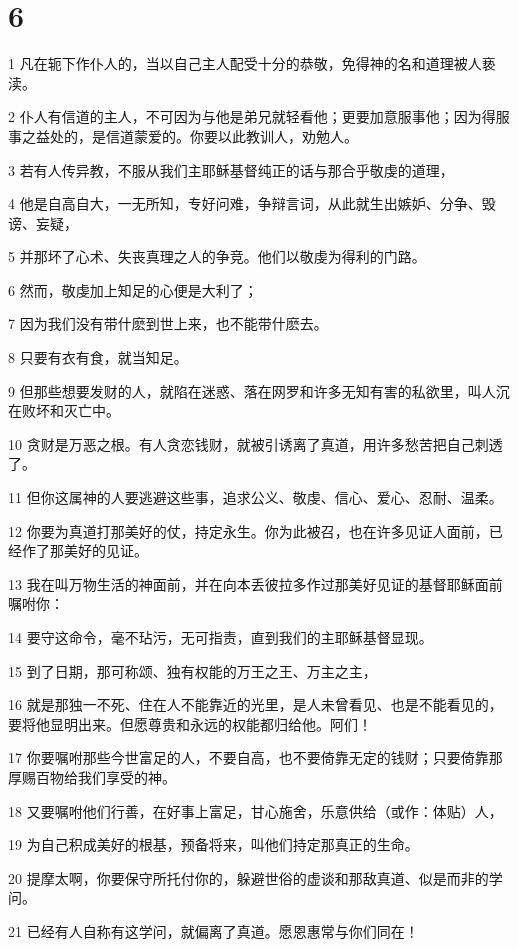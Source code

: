 \chapter{6}

\par 1 凡在轭下作仆人的，当以自己主人配受十分的恭敬，免得神的名和道理被人亵渎。
\par 2 仆人有信道的主人，不可因为与他是弟兄就轻看他；更要加意服事他；因为得服事之益处的，是信道蒙爱的。你要以此教训人，劝勉人。
\par 3 若有人传异教，不服从我们主耶稣基督纯正的话与那合乎敬虔的道理，
\par 4 他是自高自大，一无所知，专好问难，争辩言词，从此就生出嫉妒、分争、毁谤、妄疑，
\par 5 并那坏了心术、失丧真理之人的争竞。他们以敬虔为得利的门路。
\par 6 然而，敬虔加上知足的心便是大利了；
\par 7 因为我们没有带什麽到世上来，也不能带什麽去。
\par 8 只要有衣有食，就当知足。
\par 9 但那些想要发财的人，就陷在迷惑、落在网罗和许多无知有害的私欲里，叫人沉在败坏和灭亡中。
\par 10 贪财是万恶之根。有人贪恋钱财，就被引诱离了真道，用许多愁苦把自己刺透了。
\par 11 但你这属神的人要逃避这些事，追求公义、敬虔、信心、爱心、忍耐、温柔。
\par 12 你要为真道打那美好的仗，持定永生。你为此被召，也在许多见证人面前，已经作了那美好的见证。
\par 13 我在叫万物生活的神面前，并在向本丢彼拉多作过那美好见证的基督耶稣面前嘱咐你：
\par 14 要守这命令，毫不玷污，无可指责，直到我们的主耶稣基督显现。
\par 15 到了日期，那可称颂、独有权能的万王之王、万主之主，
\par 16 就是那独一不死、住在人不能靠近的光里，是人未曾看见、也是不能看见的，要将他显明出来。但愿尊贵和永远的权能都归给他。阿们！
\par 17 你要嘱咐那些今世富足的人，不要自高，也不要倚靠无定的钱财；只要倚靠那厚赐百物给我们享受的神。
\par 18 又要嘱咐他们行善，在好事上富足，甘心施舍，乐意供给（或作：体贴）人，
\par 19 为自己积成美好的根基，预备将来，叫他们持定那真正的生命。
\par 20 提摩太啊，你要保守所托付你的，躲避世俗的虚谈和那敌真道、似是而非的学问。
\par 21 已经有人自称有这学问，就偏离了真道。愿恩惠常与你们同在！


